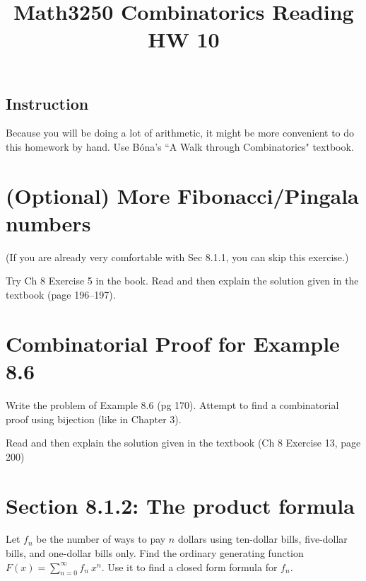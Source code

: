 \documentclass[12pt]{amsart}
\title{Math3250 Combinatorics Reading HW 10}
\begin{document}
\maketitle



\subsection*{Instruction}
Because you will be doing a lot of arithmetic, it might be more convenient to do this homework by hand.
Use B\'ona's ``A Walk through Combinatorics" textbook.

\bigskip


\section*{(Optional) More Fibonacci/Pingala numbers}

(If you are already very comfortable with Sec 8.1.1, you can skip this exercise.)

Try Ch 8 Exercise 5 in the book. Read and then explain the solution given in the textbook (page 196--197).




\section{Combinatorial Proof for Example 8.6}
Write the problem of Example 8.6 (pg 170). Attempt to find a combinatorial proof using bijection (like in Chapter 3).

Read and then explain the solution given in the textbook (Ch 8 Exercise 13, page 200)






\section{Section 8.1.2: The product formula}
Let $f_n$ be the number of ways to pay $n$ dollars using ten-dollar bills, five-dollar bills, and one-dollar bills only. 
Find the ordinary generating function $F(x) = \sum_{n=0}^\infty f_n ~ x^n$. Use it to find a closed form formula for $f_n$. \\
\end{document}
